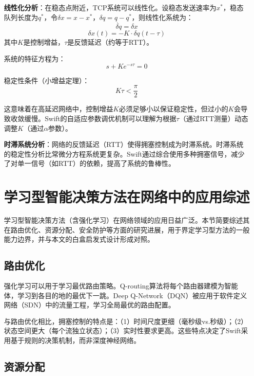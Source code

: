 \textbf{线性化分析}：在稳态点附近，TCP系统可以线性化。设稳态发送速率为$x^*$，稳态队列长度为$q^*$，令$\delta x = x - x^*$，$\delta q = q - q^*$，则线性化系统为：
\begin{equation}
\dot{\delta q} = \delta x
\end{equation}
\begin{equation}
\delta x(t) = -K \cdot \delta q(t - \tau)
\end{equation}
其中$K$是控制增益，$\tau$是反馈延迟（约等于RTT）。

系统的特征方程为：
\begin{equation}
s + K e^{-s\tau} = 0
\end{equation}

稳定性条件（小增益定理）：
\begin{equation}
K \tau < \frac{\pi}{2}
\end{equation}

这意味着在高延迟网络中，控制增益$K$必须足够小以保证稳定性，但过小的$K$会导致收敛缓慢。Swift的自适应参数调优机制可以理解为根据$\tau$（通过RTT测量）动态调整$K$（通过$\alpha$参数）。

\textbf{时滞系统分析}：网络的反馈延迟（RTT）使得拥塞控制成为时滞系统。时滞系统的稳定性分析比常微分方程系统更复杂。Swift通过综合使用多种拥塞信号，减少了对单一信号（如RTT）的依赖，提高了系统的鲁棒性。

\section{学习型智能决策方法在网络中的应用综述}

学习型智能决策方法（含强化学习）在网络领域的应用日益广泛。本节简要综述其在路由优化、资源分配、安全防护等方面的研究进展，用于界定学习型方法的一般能力边界，并与本文的白盒启发式设计形成对照。

\subsection{路由优化}

强化学习可以用于学习最优路由策略。Q-routing算法将每个路由器建模为智能体，学习到各目的地的最优下一跳。Deep Q-Network（DQN）被应用于软件定义网络（SDN）中的流量工程，学习全局最优的路由配置。

与路由优化相比，拥塞控制的特点是：（1）时间尺度更细（毫秒级vs.秒级）；（2）状态空间更大（每个流独立状态）；（3）实时性要求更高。这些特点决定了Swift采用基于规则的决策机制，而非深度神经网络。

\subsection{资源分配}

